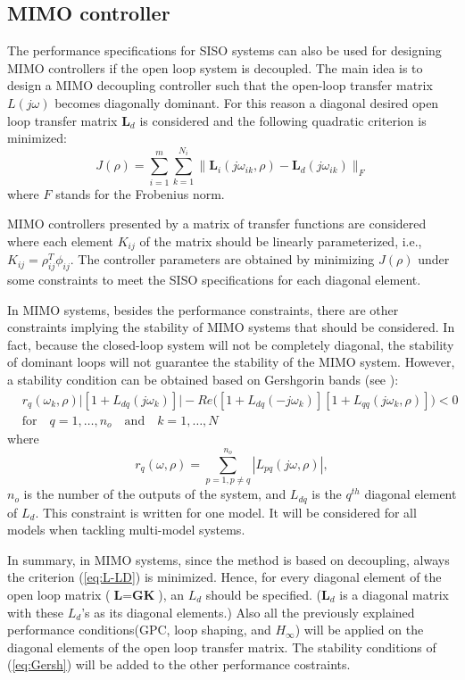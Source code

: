 \documentclass [12pt , a4paper] {article}
\begin{document}
\subsection{MIMO controller}
The performance specifications for SISO systems can also be used for designing MIMO controllers if the open loop system is decoupled. The main idea is to design a MIMO decoupling controller such that the open-loop transfer matrix $L(j\omega)$ becomes diagonally dominant. For this reason a diagonal desired open loop transfer matrix $\textbf{L}_d$ is considered and the following quadratic criterion is minimized:
\begin{equation}
\label{eq:L-LD}
J(\rho)=\sum_{i=1}^{m}\sum_{k=1}^{N_i} \| \textbf{L}_i(j\omega_{ik},\rho)- \textbf{L}_d(j\omega_{ik}) \|_F
\end{equation}
where $F$ stands for the Frobenius norm.

MIMO controllers presented by a matrix of transfer functions are considered where each element $K_{ij}$ of the matrix should be linearly parameterized, i.e., $K_{ij}=\rho_{ij}^T\phi_{ij}$. The controller parameters are obtained by minimizing $J(\rho)$ under some constraints to meet the SISO specifications for each diagonal element. 

In MIMO systems, besides the performance constraints, there are other constraints implying the stability of MIMO systems that should be considered. In fact, because the closed-loop system will not be completely diagonal, the stability of dominant loops will not guarantee the stability of the MIMO system. However, a stability condition can be obtained based on Gershgorin bands (see \cite{GKL10b}):
\begin{align}
\label{eq:Gersh}
& r_q(\omega_k,\rho)\big| [1+L_{dq}(j\omega_k)]\big|-Re\big([1+L_{dq}(-j\omega_k)][1+L_{qq}(j\omega_k,\rho)]\big)<0 \nonumber \\
& \mbox{for} \quad q=1,\ldots,n_o \quad  \mbox{and} \quad k=1,\ldots,N 
\end{align}
where
\[
r_q(\omega,\rho)=\sum_{p=1,p\neq q}^{n_o} |L_{pq}(j\omega,\rho)|,
\]
$n_o$ is the number of the outputs of the system, and $L_{dq}$ is the $q^{th}$ diagonal element of $L_d$. This constraint is written for one model. It will be considered for all models when tackling multi-model systems.

In summary, in MIMO systems, since the method is based on decoupling, always the criterion (\ref{eq:L-LD}) is minimized. Hence, for every diagonal element of the open loop matrix ($\textbf{L}=\textbf{GK}$), an $L_d$ should be specified. ($\textbf{L}_d$ is a diagonal matrix with these $L_d$'s as its diagonal elements.) Also all the previously explained performance conditions(GPC, loop shaping, and $H_\infty$) will be applied on the diagonal elements of the open loop transfer matrix. The stability conditions of (\ref{eq:Gersh}) will be added to the other performance costraints. 
\end{document}
